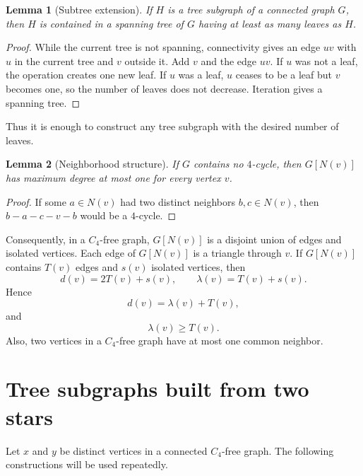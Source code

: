 \documentclass[11pt]{article}
\newtheorem{lemma}{Lemma}
\begin{document}
\begin{lemma}[Subtree extension]\label{lem:extend}
If $H$ is a tree subgraph of a connected graph $G$, then $H$ is
contained in a spanning tree of $G$ having at least as many leaves as $H$.
\end{lemma}

\begin{proof}
While the current tree is not spanning, connectivity gives an edge
$uv$ with $u$ in the current tree and $v$ outside it.  Add $v$ and the
edge $uv$.  If $u$ was not a leaf, the operation creates one new leaf.
If $u$ was a leaf, $u$ ceases to be a leaf but $v$ becomes one, so the
number of leaves does not decrease.  Iteration gives a spanning tree.
\end{proof}

Thus it is enough to construct any tree subgraph with the desired
number of leaves.

\begin{lemma}[Neighborhood structure]\label{lem:local}
If $G$ contains no $4$-cycle, then $G[N(v)]$ has maximum degree at most
one for every vertex $v$.
\end{lemma}

\begin{proof}
If some $a\in N(v)$ had two distinct neighbors $b,c\in N(v)$, then
$b-a-c-v-b$ would be a $4$-cycle.
\end{proof}

Consequently, in a $C_4$-free graph, $G[N(v)]$ is a disjoint union of
edges and isolated vertices.  Each edge of $G[N(v)]$ is a triangle
through $v$.  If $G[N(v)]$ contains $T(v)$ edges and $s(v)$ isolated
vertices, then
\[
  d(v)=2T(v)+s(v),\qquad \lambda(v)=T(v)+s(v).
\]
Hence
\begin{equation}\label{eq:degree}
  d(v)=\lambda(v)+T(v),
\end{equation}
and
\begin{equation}\label{eq:lambdaT}
  \lambda(v)\ge T(v).
\end{equation}
Also, two vertices in a $C_4$-free graph have at most one common
neighbor.

\section{Tree subgraphs built from two stars}

Let $x$ and $y$ be distinct vertices in a connected $C_4$-free graph.
The following constructions will be used repeatedly.
\end{document}
